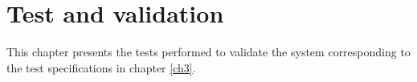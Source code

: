 \chapter{Test and validation} \label{ch9}
This chapter presents the tests performed to validate the system corresponding to the test specifications in chapter \ref{ch3}.\\
   

